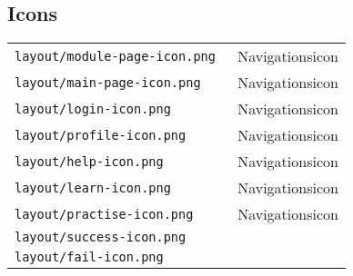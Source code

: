 \setcounter{section}{0}
\setcounter{subsection}{0}
\renewcommand*\thesection{\Alph{section}}









\subsection{Icons}
\begin{tabular}{ | l | l | } 
  \texttt{layout/module-page-icon.png } & Navigationsicon \\
  \texttt{layout/main-page-icon.png   } & Navigationsicon \\
  \texttt{layout/login-icon.png       } & Navigationsicon \\
  \texttt{layout/profile-icon.png     } & Navigationsicon \\
  \texttt{layout/help-icon.png        } & Navigationsicon \\
  \texttt{layout/learn-icon.png       } & Navigationsicon \\
  \texttt{layout/practise-icon.png    } & Navigationsicon \\
  \texttt{layout/success-icon.png     } & \\
  \texttt{layout/fail-icon.png        } & \\
\end{tabular}

